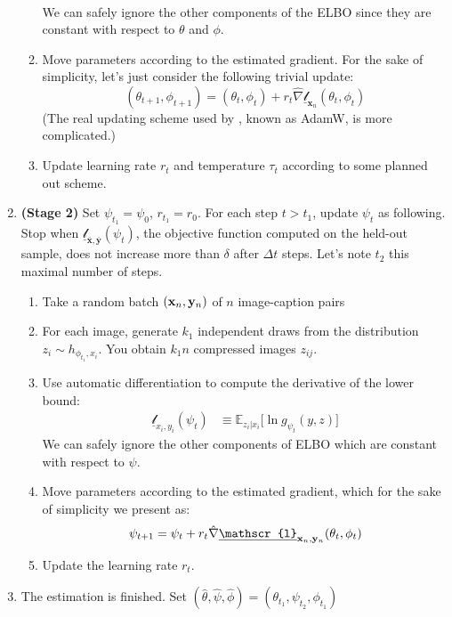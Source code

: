 \documentclass{article}
\begin{document}
\begin{appendix}
\begin{enumerate}
\begin{enumerate}
\begin{align*}
    \end{align*}
    We can safely ignore the other components of the ELBO since they are constant with respect to $\theta$ and $\phi$.
    \item Move parameters according to the estimated gradient. For the sake of simplicity, let's just consider the following trivial update: $$(\theta_{t+1},\phi_{t+1})=(\theta_{t},\phi_{t})+r_t\hat{\nabla}\underline{\mathscr{l}}_{\mathbf{x}_n}(\theta_{t},\phi_{t})$$
    (The real updating scheme used by \citeauthor{zeroshot}, known as AdamW, is more complicated.)
    \item Update learning rate $r_t$ and temperature $\tau_t$ according to some planned out scheme.
    \end{enumerate}
    
    \item \textbf{(Stage 2)} Set $\psi_{t_1}=\psi_0$, $r_{t_1}=r_0$. For each step $t>t_{1}$, update $\psi_t$ as following. Stop when $\underline{\mathscr{l}}_{\bar{\mathbf{x}},\bar{\mathbf{y}}}(\psi_t)$, the objective function computed on the held-out sample, does not increase more than $\delta$ after $\Delta t$ steps.  Let's note $t_2$ this maximal number of steps.
    
    \begin{enumerate}
    \item Take a random batch $(\mathbf{x}_n,\mathbf{y}_n)$ of $n$ image-caption pairs
    \item For each image, generate $k_1$ independent draws from the distribution $z_i\sim h_{\phi_{t_1},x_i}$. You obtain $k_1n$ compressed images $z_{ij}$.
    \item Use automatic differentiation to compute the derivative of the lower bound: \begin{align*}
    \underline{\mathscr{l}}_{x_i,y_i}(\psi_t) & \equiv \mathbb{E}_{z_i|x_i} \Big[\ln g_{\psi_t}(y,z)\Big]
    \end{align*}
    We can safely ignore the other components of ELBO which are constant with respect to $\psi$.
    \item Move parameters according to the estimated gradient, which for the sake of simplicity we present as: $$\psi_{t+1}=\psi_{t}+r_t\hat{\nabla}\underline{\mathscr{l}}_{\xn,\yn}(\theta_{t},\phi_{t})$$
    \item Update the learning rate $r_t$.
    \end{enumerate}
    \item The estimation is finished. Set $(\hat \theta, \hat \psi, \hat \phi)=(\theta_{t_1}, \psi_{t_2}, \phi_{t_1})$
\end{enumerate}


\end{appendix}
\end{document}

